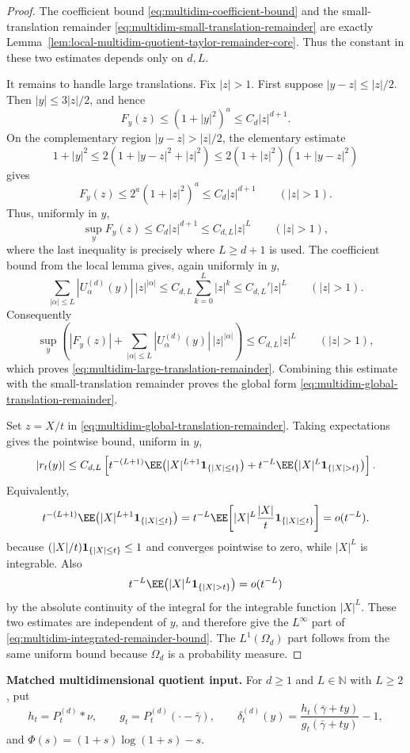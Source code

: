 \begin{proof}
The coefficient bound \eqref{eq:multidim-coefficient-bound} and the
small-translation remainder
\eqref{eq:multidim-small-translation-remainder} are exactly
Lemma~\ref{lem:local-multidim-quotient-taylor-remainder-core}.  Thus the
constant in these two estimates depends only on \(d,L\).

It remains to handle large translations.  Fix \(|z|>1\).  First suppose
\(|y-z|\le |z|/2\).  Then \(|y|\le3|z|/2\), and hence
\[
F_y(z)\le (1+|y|^2)^a\le C_d|z|^{d+1}.
\]
On the complementary region \(|y-z|>|z|/2\), the elementary estimate
\[
1+|y|^2
\le 2(1+|y-z|^2+|z|^2)
\le 2(1+|z|^2)(1+|y-z|^2)
\]
gives
\[
F_y(z)
\le 2^a(1+|z|^2)^a
\le C_d|z|^{d+1}
\qquad(|z|>1).
\]
Thus, uniformly in \(y\),
\[
\sup_y F_y(z)\le C_d|z|^{d+1}\le C_{d,L}|z|^L
\qquad(|z|>1),
\]
where the last inequality is precisely where \(L\ge d+1\) is used.  The
coefficient bound from the local lemma gives, again uniformly in \(y\),
\[
\sum_{|\alpha|\le L}|U_\alpha^{(d)}(y)|\,|z|^{|\alpha|}
\le C_{d,L}\sum_{k=0}^{L}|z|^k
\le C_{d,L}'|z|^L
\qquad(|z|>1).
\]
Consequently
\[
\sup_y\left(
|F_y(z)|
+\sum_{|\alpha|\le L}|U_\alpha^{(d)}(y)|\,|z|^{|\alpha|}
\right)
\le C_{d,L}|z|^L
\qquad(|z|>1),
\]
which proves \eqref{eq:multidim-large-translation-remainder}.  Combining
this estimate with the small-translation remainder proves the global form
\eqref{eq:multidim-global-translation-remainder}.

Set \(z=X/t\) in \eqref{eq:multidim-global-translation-remainder}.  Taking
expectations gives the pointwise bound, uniform in \(y\),
\[
|r_t(y)|
\le
C_{d,L}\left[
t^{-(L+1)}
\EE\!\left(|X|^{L+1}{\bf1}_{\{|X|\le t\}}\right)
+t^{-L}
\EE\!\left(|X|^L{\bf1}_{\{|X|>t\}}\right)
\right].
\]
Equivalently,
\[
t^{-(L+1)}
\EE\!\left(|X|^{L+1}{\bf1}_{\{|X|\le t\}}\right)
=
t^{-L}
\EE\!\left[
|X|^L\frac{|X|}{t}{\bf1}_{\{|X|\le t\}}
\right]
=o(t^{-L}).
\]
because \((|X|/t){\bf1}_{\{|X|\le t\}}\le1\) and converges pointwise to
zero, while \(|X|^L\) is integrable.  Also
\[
t^{-L}\EE\!\left(|X|^L{\bf1}_{\{|X|>t\}}\right)=o(t^{-L})
\]
by the absolute continuity of the integral for the integrable function
\(|X|^L\).  These two estimates are independent of \(y\), and therefore give
the \(L^\infty\) part of \eqref{eq:multidim-integrated-remainder-bound}.
The \(L^1(\Omega_d)\) part follows from the same uniform bound because
\(\Omega_d\) is a probability measure.
\end{proof}

\medskip
\noindent\textbf{Matched multidimensional quotient input.}
For \(d\ge1\) and \(L\in\mathbb N\) with \(L\ge2\), put
\[
h_t=P_t^{(d)}*\nu,\qquad
g_t=P_t^{(d)}(\cdot-\bar{\gamma}),\qquad
\delta_t^{(d)}(y)=
\frac{h_t(\bar{\gamma}+ty)}{g_t(\bar{\gamma}+ty)}-1,
\]
and \(\Phi(s)=(1+s)\log(1+s)-s\).

